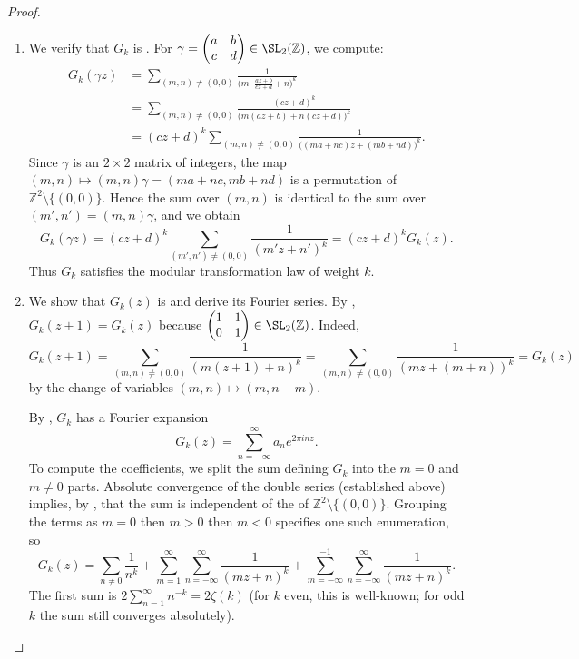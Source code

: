 \begin{proof}
\begin{enumerate}
  \item We verify that $G_k$ is . For $\gamma = \begin{pmatrix} a & b \\ c & d \end{pmatrix} \in \SL_2(\mathbb{Z})$, we compute:
  \begin{align*}
    G_k(\gamma z) &= \sum_{(m,n) \neq (0,0)} \frac{1}{\bigl(m \cdot \frac{az+b}{cz+d} + n\bigr)^k} \\
    &= \sum_{(m,n) \neq (0,0)} \frac{(cz+d)^k}{\bigl(m(az+b) + n(cz+d)\bigr)^k} \\
    &= (cz+d)^k \sum_{(m,n) \neq (0,0)} \frac{1}{\bigl((ma+nc)z + (mb+nd)\bigr)^k}.
  \end{align*}
  Since $\gamma$ is an  $2 \times 2$ matrix of integers, the map $(m,n) \mapsto (m,n)\gamma = (ma+nc, mb+nd)$ is a permutation of $\mathbb{Z}^2 \setminus \{(0,0)\}$. Hence the sum over $(m,n)$ is identical to the sum over $(m',n') = (m,n)\gamma$, and we obtain
  $$G_k(\gamma z) = (cz+d)^k \sum_{(m',n') \neq (0,0)} \frac{1}{(m'z + n')^k} = (cz+d)^k G_k(z).$$
  Thus $G_k$ satisfies the modular transformation law of weight $k$.

  \item We show that $G_k(z)$ is  and derive its Fourier series. By , $G_k(z+1) = G_k(z)$ because $\begin{pmatrix} 1 & 1 \\ 0 & 1 \end{pmatrix} \in \SL_2(\mathbb{Z})$. Indeed,
  $$G_k(z+1) = \sum_{(m,n) \neq (0,0)} \frac{1}{(m(z+1) + n)^k} = \sum_{(m,n) \neq (0,0)} \frac{1}{(mz + (m+n))^k} = G_k(z)$$
  by the change of variables $(m,n) \mapsto (m, n-m)$.

  By , $G_k$ has a Fourier expansion
  $$G_k(z) = \sum_{n=-\infty}^{\infty} a_n e^{2\pi i n z}.$$
  To compute the coefficients, we split the sum defining $G_k$ into the $m = 0$ and $m \neq 0$ parts.
  Absolute convergence of the double series (established above) implies, by , that the sum is independent of the  of $\mathbb{Z}^2\setminus\{(0,0)\}$. Grouping the terms as $m=0$ then $m>0$ then $m<0$ specifies one such enumeration, so
  $$G_k(z) = \sum_{n \neq 0} \frac{1}{n^k} + \sum_{m=1}^{\infty} \sum_{n=-\infty}^{\infty} \frac{1}{(mz + n)^k} + \sum_{m=-\infty}^{-1} \sum_{n=-\infty}^{\infty} \frac{1}{(mz + n)^k}.$$
  The first sum is $2\sum_{n=1}^{\infty} n^{-k} = 2\zeta(k)$ (for $k$ even, this is well-known; for odd $k$ the sum still converges absolutely).


\end{enumerate}
\end{proof}
